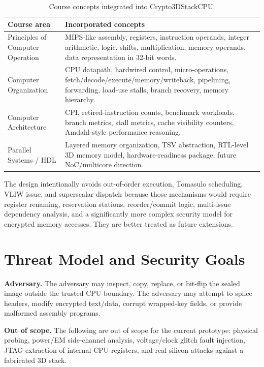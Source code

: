 \documentclass[conference]{IEEEtran}
\begin{document}
\begin{table}[!t]
\caption{Course concepts integrated into Crypto3DStackCPU.}
\label{tab:course-map}
\centering
\scriptsize
\begin{tabularx}{\columnwidth}{@{}L{0.24\columnwidth}Y@{}}
\toprule
Course area & Incorporated concepts \\
\midrule
Principles of Computer Operation & MIPS-like assembly, registers, instruction operands, integer arithmetic, logic, shifts, multiplication, memory operands, data representation in 32-bit words. \\
Computer Organization & CPU datapath, hardwired control, micro-operations, fetch/decode/execute/memory/writeback, pipelining, forwarding, load-use stalls, branch recovery, memory hierarchy. \\
Computer Architecture & CPI, retired-instruction counts, benchmark workloads, branch metrics, stall metrics, cache visibility counters, Amdahl-style performance reasoning. \\
Parallel Systems / HDL & Layered memory organization, TSV abstraction, RTL-level 3D memory model, hardware-readiness package, future NoC/multicore direction. \\
\bottomrule
\end{tabularx}
\end{table}

The design intentionally avoids out-of-order execution, Tomasulo scheduling, VLIW issue, and superscalar dispatch because those mechanisms would require register renaming, reservation stations, reorder/commit logic, multi-issue dependency analysis, and a significantly more complex security model for encrypted memory accesses. They are better treated as future extensions.

\section{Threat Model and Security Goals}

\textbf{Adversary.} The adversary may inspect, copy, replace, or bit-flip the sealed image outside the trusted CPU boundary. The adversary may attempt to splice headers, modify encrypted text/data, corrupt wrapped-key fields, or provide malformed assembly programs.

\textbf{Out of scope.} The following are out of scope for the current prototype: physical probing, power/EM side-channel analysis, voltage/clock glitch fault injection, JTAG extraction of internal CPU registers, and real silicon attacks against a fabricated 3D stack.
\end{document}
